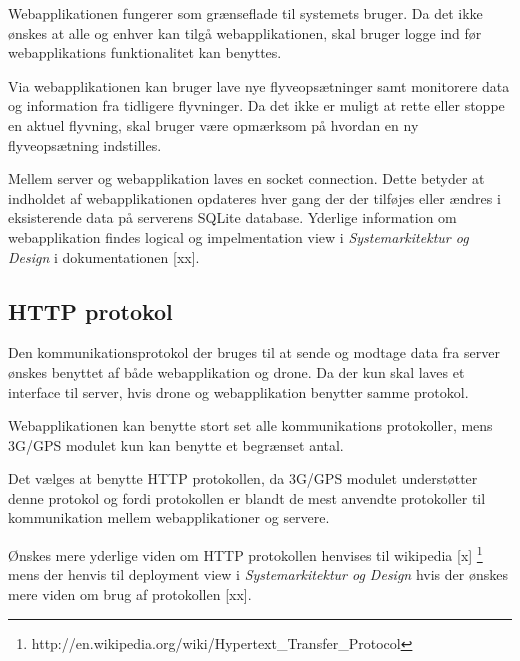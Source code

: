 Webapplikationen fungerer som grænseflade til systemets bruger. Da det ikke ønskes at alle og enhver kan tilgå webapplikationen, skal bruger logge ind før webapplikations funktionalitet kan benyttes. 

Via webapplikationen kan bruger lave nye flyveopsætninger samt monitorere data og information fra tidligere flyvninger. Da det ikke er muligt at rette eller stoppe en aktuel flyvning, skal bruger være opmærksom på hvordan en ny flyveopsætning indstilles. 

Mellem server og webapplikation laves en socket connection. Dette betyder at indholdet af webapplikationen opdateres hver gang der der tilføjes eller ændres i eksisterende data på serverens SQLite database. Yderlige information om webapplikation findes logical og impelmentation view i \textit{Systemarkitektur og Design} i dokumentationen [xx].


\subsection{HTTP protokol}

Den kommunikationsprotokol der bruges til at sende og modtage data fra server ønskes benyttet af både webapplikation og drone. Da der kun skal laves et interface til server, hvis drone og webapplikation benytter samme protokol.

Webapplikationen kan benytte stort set alle kommunikations protokoller, mens 3G/GPS modulet kun kan benytte et begrænset antal.

Det vælges at benytte HTTP protokollen, da 3G/GPS modulet understøtter denne protokol og fordi protokollen er blandt de mest anvendte protokoller til kommunikation mellem webapplikationer og servere.

Ønskes mere yderlige viden om HTTP protokollen henvises til wikipedia [x] \footnote{http://en.wikipedia.org/wiki/Hypertext\_Transfer\_Protocol} mens der henvis til deployment view i \textit{Systemarkitektur og Design} hvis der ønskes mere viden om brug af protokollen [xx]. 